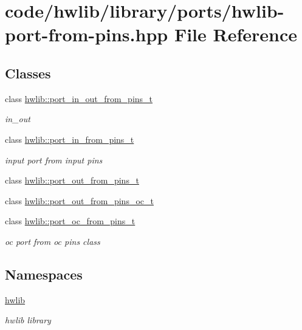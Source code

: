 \hypertarget{hwlib-port-from-pins_8hpp}{}\section{code/hwlib/library/ports/hwlib-\/port-\/from-\/pins.hpp File Reference}
\label{hwlib-port-from-pins_8hpp}
\subsection*{Classes}
\begin{DoxyCompactItemize}
\item 
class \hyperlink{classhwlib_1_1port__in__out__from__pins__t}{hwlib\+::port\+\_\+in\+\_\+out\+\_\+from\+\_\+pins\+\_\+t}
\begin{DoxyCompactList}\small\item\em in\+\_\+out \end{DoxyCompactList}\item 
class \hyperlink{classhwlib_1_1port__in__from__pins__t}{hwlib\+::port\+\_\+in\+\_\+from\+\_\+pins\+\_\+t}
\begin{DoxyCompactList}\small\item\em input port from input pins \end{DoxyCompactList}\item 
class \hyperlink{classhwlib_1_1port__out__from__pins__t}{hwlib\+::port\+\_\+out\+\_\+from\+\_\+pins\+\_\+t}
\item 
class \hyperlink{classhwlib_1_1port__out__from__pins__oc__t}{hwlib\+::port\+\_\+out\+\_\+from\+\_\+pins\+\_\+oc\+\_\+t}
\item 
class \hyperlink{classhwlib_1_1port__oc__from__pins__t}{hwlib\+::port\+\_\+oc\+\_\+from\+\_\+pins\+\_\+t}
\begin{DoxyCompactList}\small\item\em oc port from oc pins class \end{DoxyCompactList}\end{DoxyCompactItemize}
\subsection*{Namespaces}
\begin{DoxyCompactItemize}
\item 
 \hyperlink{namespacehwlib}{hwlib}
\begin{DoxyCompactList}\small\item\em hwlib library \end{DoxyCompactList}\end{DoxyCompactItemize}
